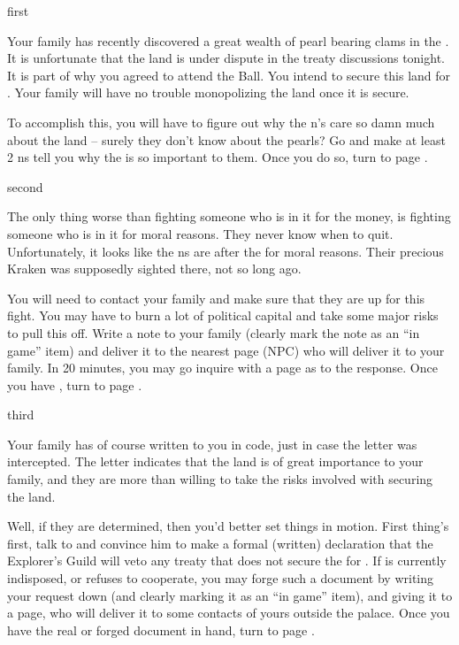 \documentclass[greennotebook]{NeptuneBall}
\begin{document}

\startnotebook{\nGazaStrip{}}

\begin{page}{first}

Your family has recently discovered a great wealth of pearl bearing clams in the \pGazaStrip{}. It is unfortunate that the land is under dispute in the treaty discussions tonight. It is part of why you agreed to attend the \cExExKing{} Ball. You intend to secure this land for \pAtlantis{}. Your family will have no trouble monopolizing the land once it is secure. 

To accomplish this, you will have to figure out why the \pPacifica{}n's care so damn much about the land -- surely they don't know about the pearls? Go and make at least 2 \pPacifica{}ns tell you why the \pGazaStrip{} is so important to them. Once you do so, turn to page .

\end{page}

\begin{page}{second}

The only thing worse than fighting someone who is in it for the money, is fighting someone who is in it for moral reasons. They never know when to quit. Unfortunately, it looks like the \pPacifica{}ns are after the \pGazaStrip{} for moral reasons. Their precious Kraken was supposedly sighted there, not so long ago.

You will need to contact your family and make sure that they are up for this fight. You may have to burn a lot of political capital and take some major risks to pull this off. Write a note to your family (clearly mark the note as an ``in game'' item) and deliver it to the nearest page (NPC) who will deliver it to your family. In 20 minutes, you may go inquire with a page as to the response. Once you have \iCipherLetter{}, turn to page .

\end{page}

\begin{page}{third}

Your family has of course written to you in code, just in case the letter was intercepted. The letter indicates that the land is of great importance to your family, and they are more than willing to take the risks involved with securing the land. 

Well, if they are determined, then you'd better set things in motion. First thing's first, talk to \cPlant{} and convince him to make a formal (written) declaration that the Explorer's Guild will veto any treaty that does not secure the \pGazaStrip{} for \pAtlantis{}. If \cPlant{\they} is currently indisposed, or refuses to cooperate, you may forge such a document by writing your request down (and clearly marking it as an ``in game'' item), and giving it to a page, who will deliver it to some contacts of yours outside the palace. Once you have the real or forged document in hand, turn to page .

\end{page}
\end{document}
